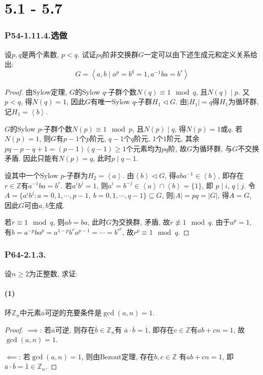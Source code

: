 \documentclass[12pt, a4paper, fontset=windows]{ctexart}
\newcommand{\Z}{\mathbb{Z}}
\newcommand{\abs}[1]{\left|{#1}\right|}
\newcommand{\cl}[1]{\overline{#1}} %
\newcommand{\gen}[1]{\left\langle{#1}\right\rangle}
\newcommand{\xuan}{{\normalsize 选做}}
\begin{document}
\clearpage
\part{5.1 - 5.7}

\section*{P54-1.11.4.\xuan}
\label{pq-nonabel}

设$p,q$是两个素数, $p<q$. 试证$pq$阶非交换群$G$一定可以由下述生成元和定义关系给出: 
\[G=\gen{a,b\mid a^p=b^q=1,a^{-1}ba=b^r}\]

\begin{proof}
由Sylow定理, $G$的Sylow $q$-子群个数$N(q)\equiv 1\mod{q}$, 且$N(q)\mid p$. 
又$p<q$, 得$N(q)=1$, 因此$G$有唯一Sylow $q$-子群$H_1\lhd G$. 
由$\abs{H_1}=q$得$H_1$为循环群, 记$H_1=\gen{b}$. 

$G$的Sylow $p$-子群个数$N(p)\equiv 1\mod{p}$, 且$N(p)\mid q$, 
得$N(p)=1$或$q$. 若$N(p)=1$, 则$G$有$p-1$个$p$阶元, $q-1$个$q$阶元, 
$1$个$1$阶元, 其余$pq-p-q+1=(p-1)(q-1)\ge 1$个元素均为$pq$阶, 
故$G$为循环群, 与$G$不交换矛盾. 因此只能有$N(p)=q$, 此时$p\mid q-1$. 

设其中一个Sylow $p$-子群为$H_2=\gen{a}$. 由$\gen{b}\lhd G$, 
得$aba^{-1}\in\gen{b}$, 即存在$r\in\Z$有$a^{-1}ba=b^r$. 
若$a^ib^j=1$, 则$a^i=b^{-j}\in\gen{a}\cap\gen{b}=\{1\}$, 即
$p\mid i$, $q\mid j$. 令$A=\{a^ib^j:a=0,1,\cdots,p-1,\ b=0,1,\cdots,q-1\}\subseteq G$, 
则$\abs{A}=pq=\abs{G}$, 得$A=G$, 因此$G$可由$a,b$生成. 

若$r\equiv 1\mod{q}$, 则$ab=ba$, 此时$G$为交换群, 矛盾, 故$r\not\equiv 1\mod{q}$. 
由于$a^p=1$, 有$b=a^{-p}ba^p=a^{1-p}b^ra^{p-1}=\cdots=b^{r^p}$, 
故$r^p\equiv 1\mod{q}$. 
\end{proof}

\section*{P64-2.1.3.}

设$n\ge 2$为正整数, 求证: 

\subsection*{(1)}

环$\Z_n$中元素$\cl{a}$可逆的充要条件是$\gcd(a,n)=1$. 

\begin{proof}
$\implies$: 若$\cl{a}$可逆, 则存在$\cl{b}\in\Z_n$有
$\cl{a}\cdot\cl{b}=\cl{1}$, 即存在$c\in\Z$有$ab+cn=1$, 故$\gcd(a,n)=1$. 

$\impliedby$: 若$\gcd(a,n)=1$, 则由Bezout定理, 存在$b,c\in\Z$
有$ab+cn=1$, 即$\cl{a}\cdot\cl{b}=\cl{1}\in\Z_n$. 
\end{proof}
\end{document}
